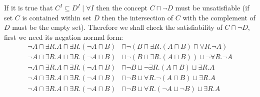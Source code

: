 \documentclass[a4paper,12pt]{article}
\begin{document}
If it is true that $ C^I \subseteq D^I \mid \forall I$ then the concept $ C
\sqcap \neg D $ must be unsatisfiable (if set $C$ is contained within set $D$
then the intersection of $C$ with the complement of $D$ must be the empty set).
Therefore we shall check the satisfiability of $ C \sqcap \neg D $, first we
need its negation normal form:
\begin{align*}
        \neg A \sqcap \exists R.A \sqcap \exists R.(\neg A \sqcap B)
&\sqcap \neg (B \sqcap \exists R.(A \sqcap B) \sqcap \forall R.\neg A)\\
        \neg A \sqcap \exists R.A \sqcap \exists R.(\neg A \sqcap B)
&\sqcap \neg (B \sqcap \exists R.(A \sqcap B)) \sqcup \neg \forall R.\neg A\\
        \neg A \sqcap \exists R.A \sqcap \exists R.(\neg A \sqcap B)
&\sqcap \neg B \sqcup \neg \exists R.(A \sqcap B) \sqcup \exists R.A\\
        \neg A \sqcap \exists R.A \sqcap \exists R.(\neg A \sqcap B)
&\sqcap \neg B \sqcup \forall R.\neg (A \sqcap B) \sqcup \exists R.A\\
        \neg A \sqcap \exists R.A \sqcap \exists R.(\neg A \sqcap B)
&\sqcap \neg B \sqcup \forall R.(\neg A \sqcup \neg B) \sqcup \exists R.A\\
\end{align*}
\end{document}
